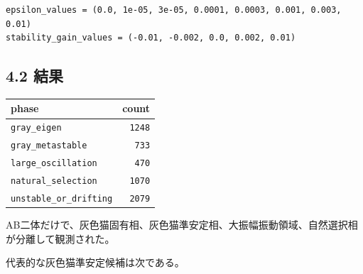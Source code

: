 \documentclass{article}
\newcounter{none}
\begin{document}
\begin{verbatim}
epsilon_values = (0.0, 1e-05, 3e-05, 0.0001, 0.0003, 0.001, 0.003, 0.01)
stability_gain_values = (-0.01, -0.002, 0.0, 0.002, 0.01)
\end{verbatim}

\subsection{4.2 結果}\label{ux7d50ux679c}

{\def\LTcaptype{none} %
\begin{longtable}[]{@{}lr@{}}
\toprule\noalign{}
phase & count \\
\midrule\noalign{}
\endhead
\bottomrule\noalign{}
\endlastfoot
\texttt{gray\_eigen} & \texttt{1248} \\
\texttt{gray\_metastable} & \texttt{733} \\
\texttt{large\_oscillation} & \texttt{470} \\
\texttt{natural\_selection} & \texttt{1070} \\
\texttt{unstable\_or\_drifting} & \texttt{2079} \\
\end{longtable}
}

AB二体だけで、灰色猫固有相、灰色猫準安定相、大振幅振動領域、自然選択相が分離して観測された。

代表的な灰色猫準安定候補は次である。
\end{document}
